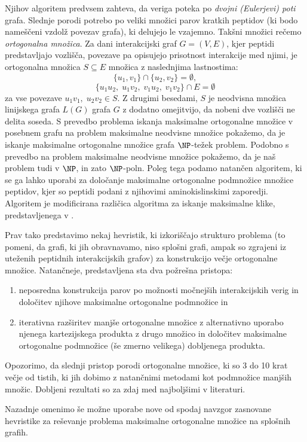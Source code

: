 \documentclass[12pt,a4paper,titlepage,openany]{report}
\begin{document}
Njihov algoritem predvsem zahteva, da veriga poteka po \emph{dvojni (Eulerjevi)
poti} grafa.  Slednje porodi potrebo po veliki množici parov kratkih peptidov
(ki bodo nameščeni vzdolž povezav grafa), ki delujejo le vzajemno. Takšni množici rečemo \emph{ortogonalna množica}. Za dani interakcijski graf  $G = (V, E)$, kjer peptidi predstavljajo  vozlišča, povezave pa opisujejo prisotnost interakcije med njimi, je ortogonalna množica $S \subseteq E$ množica z naslednjima lastnostima:
\[  \{u_1,v_1\} \cap \{u_2, v_2\} = \emptyset,\] 
\[ \{u_1u_2,\; u_1v_2,\; v_1u_2,\; v_1v_2\} \cap E = \emptyset \]
za vse povezave $u_1v_1,\;u_2v_2 \in S$. Z drugimi besedami, $S$ je neodvisna množica linij\-ske\-ga grafa $L(G)$ grafa $G$ z dodatno 
omejitvijo, da nobeni dve vozlišči ne delita soseda. S prevedbo problema iskanja maksimalne ortogonalne množice v posebnem grafu na problem maksimalne neodvisne množice  pokažemo, 
da je iskanje maksimalne ortogonalne množice grafa $\NP$-težek problem. Podobno  s prevedbo na problem maksimalne neodvisne množice pokažemo, da je naš problem tudi v $\NP$, in zato $\NP$-poln. Poleg tega podamo  natančen algoritem, ki se ga lahko uporabi za določanje maksimalne ortogonalne podmnožice množice peptidov, kjer so peptidi podani z njihovimi
aminokislinskimi zaporedji. Algoritem je modificirana različica algoritma za iskanje maksimalne klike, predstavljenega v \cite{depolli2013exact}.

Prav tako predstavimo nekaj hevristik, ki izkoriščajo strukturo problema (to pomeni,
da grafi, ki jih obravnavamo, niso splošni grafi, ampak so zgrajeni iz uteženih peptidnih
interakcijskih grafov) za konstrukcijo večje ortogonalne množice. 
Natančneje, predstavljena sta dva požrešna pristopa:
\begin{enumerate}
	\item neposredna konstrukcija parov po možnosti močnejših interakcijskih verig in določitev
	njihove maksimalne ortogonalne podmnožice in
	\item iterativna razširitev  manjše ortogonalne množice  z alternativno uporabo njenega kartezijskega produkta z drugo množico in določitev maksimalne ortogonalne podmnožice 
	(še zmerno velikega) dobljenega produkta.
\end{enumerate} 
Opozorimo, da slednji pristop porodi ortogonalne množice, ki so 3 do 10 krat večje od tistih, ki jih dobimo z natančnimi metodami kot podmnožice manjših množic.
Dobljeni rezultati so za zdaj med najboljšimi v literaturi.

Nazadnje omenimo še  možne uporabe nove  od spodaj navzgor  zasnovane hevristike za reševanje problema maksimalne ortogonalne množice na splošnih grafih.


\thispagestyle{fancy}




\label{LastPage} 
\phantom{dummy}
\end{document}
